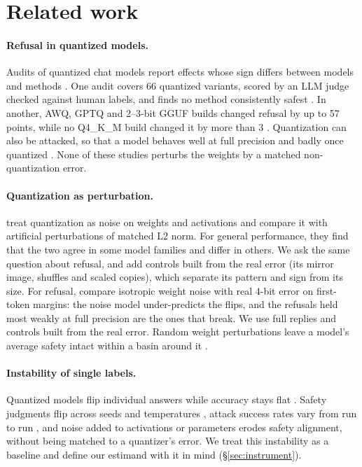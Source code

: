 \section{Related work}
\label{sec:related}

\paragraph{Refusal in quantized models.}
Audits of quantized chat models report effects whose sign differs between models and methods \citep{hong2024decoding, chen2025qresafe, kharinaev2025investigating, kadadekar2026quality, prasad2026temperature, wu2026decisions}. One audit covers 66 quantized variants, scored by an LLM judge checked against human labels, and finds no method consistently safest \citep{kharinaev2025investigating}. In another, AWQ, GPTQ and 2--3-bit GGUF builds changed refusal by up to 57 points, while no Q4\_K\_M build changed it by more than 3 \citep{kadadekar2026quality}. Quantization can also be attacked, so that a model behaves well at full precision and badly once quantized \citep{egashira2024exploiting, egashira2025gguf}. None of these studies perturbs the weights by a matched non-quantization error.

\paragraph{Quantization as perturbation.}
\citet{gong2024perturbation} treat quantization as noise on weights and activations and compare it with artificial perturbations of matched L2 norm. For general performance, they find that the two agree in some model families and differ in others. We ask the same question about refusal, and add controls built from the real error (its mirror image, shuffles and scaled copies), which separate its pattern and sign from its size. For refusal, \citet{razan2026firstorder} compare isotropic weight noise with real 4-bit error on first-token margins: the noise model under-predicts the flips, and the refusals held most weakly at full precision are the ones that break. We use full replies and controls built from the real error. Random weight perturbations leave a model's average safety intact within a basin around it \citep{peng2024safety}.

\paragraph{Instability of single labels.}
Quantized models flip individual answers while accuracy stays flat \citep{dutta2024accuracy}. Safety judgments flip across seeds and temperatures \citep{larsen2025instability, prasad2026temperature}, attack success rates vary from run to run \citep{greatpretender2026}, and noise added to activations \citep{shahani2025noise} or parameters \citep{liu2026aligned} erodes safety alignment, without being matched to a quantizer's error. We treat this instability as a baseline and define our estimand with it in mind (\S\ref{sec:instrument}).

